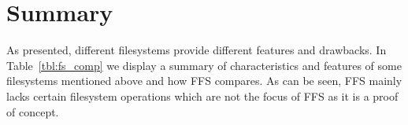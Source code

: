 
\section{Summary} %


As presented, different filesystems provide different features and drawbacks. 
In Table~\ref{tbl:fs_comp} we display a summary of characteristics and features 
of some filesystems mentioned above and how FFS compares. As can be seen, FFS 
mainly lacks certain filesystem operations which are not the focus of
FFS as it is a proof of concept. 

